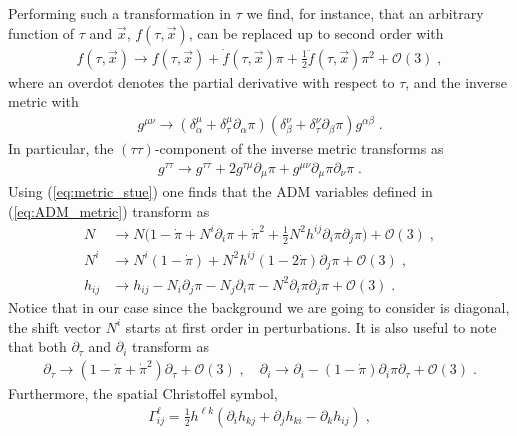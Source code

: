 \documentclass[a4paper,11pt]{article}
\numberwithin{equation}{section}
\begin{document}
Performing such a transformation in $\tau$ we find, for instance, that an arbitrary function of $\tau$ and $\vec{x}$, $f(\tau,\vec{x})$, can be replaced up to second order with
\begin{align}
f(\tau,\vec{x}) \rightarrow f(\tau,\vec{x}) + \dot{f}(\tau,\vec{x}) \pi + \frac{1}{2} \ddot{f}(\tau,\vec{x}) \pi^2 + \mathcal{O}(3) \;,
\end{align}
where an overdot denotes the partial derivative with respect to $\tau$, and the inverse metric with 
\begin{align}\label{eq:metric_stue}
g^{\mu\nu} \rightarrow (\delta^\mu_\alpha + \delta^\mu_\tau \partial_\alpha \pi)(\delta^\nu_\beta + \delta^\nu_\tau \partial_\beta \pi) g^{\alpha \beta} \;. 
\end{align}
In particular, the $(\tau\tau)$-component of the inverse metric transforms as 
\begin{align}\label{eq:stu_g_tautau}
g^{\tau\tau} \rightarrow g^{\tau\tau} + 2 g^{\tau \mu} \partial_\mu \pi + g^{\mu\nu} \partial_\mu \pi \partial_\nu \pi \;.
\end{align}
Using (\ref{eq:metric_stue}) one finds that the ADM variables defined in (\ref{eq:ADM_metric}) transform as
\begin{align}
N &\rightarrow N\bigg(1 - \dot{\pi} + N^i\partial_i \pi + \dot{\pi}^2 + \frac{1}{2} N^2 h^{ij}\partial_i\pi \partial_j \pi\bigg) + \mathcal{O}(3)  \;, \\
N^i &\rightarrow N^i(1 - \dot{\pi}) + N^2 h^{ij} (1 - 2\dot{\pi}) \partial_j \pi + \mathcal{O}(3) \;, \\
h_{ij} &\rightarrow h_{ij} - N_i\partial_j\pi - N_j \partial_i \pi - N^2 \partial_i\pi \partial_j \pi + \mathcal{O}(3) \;. 
\end{align}
Notice that in our case since the background we are going to consider is diagonal, the shift vector $N^i$ starts at first order in perturbations. It is also useful to note that both $\partial_\tau$ and $\partial_i$ transform as
\begin{align}
\partial_\tau \rightarrow (1 - \dot{\pi} + \dot{\pi}^2) \partial_\tau + \mathcal{O}(3) \;, \quad \partial_i \rightarrow  \partial_i - (1 - \dot{\pi}) \partial_i\pi \partial_\tau + \mathcal{O}(3) \;.
\end{align} 
Furthermore, the spatial Christoffel symbol,
\begin{align}
\Gamma_{ij}^\ell = \frac{1}{2}h^{\ell k}(\partial_i h_{k j} + \partial_j h_{k i} - \partial_k h_{i j}) \;,
\end{align}
\end{document}
